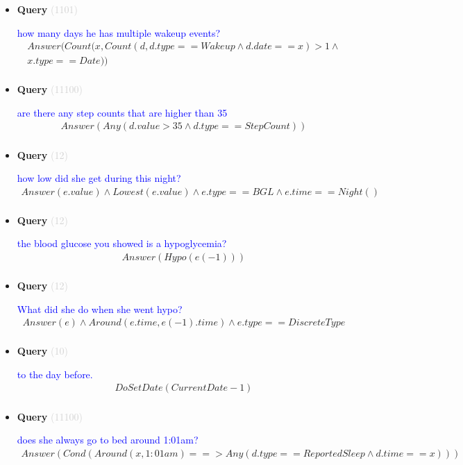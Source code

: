 \documentclass[11pt]{article}
\newcommand{\key}[1]{\textcolor{lightgray}{#1}}
\newcounter{CQuery}
\begin{document}
\begin{itemize}
\item
\textbf{Query\theCQuery} \key{(1101)} \addtocounter{CQuery}{1}
\textcolor{blue}{ how many days he has multiple wakeup events? }
\begin{multline*}
Answer(Count(x, Count(d, d.type==Wakeup \wedge d.date==x)>1 \wedge \\ 
x.type==Date)) \\ 
\end{multline*}


\item
\textbf{Query\theCQuery} \key{(11100)} \addtocounter{CQuery}{1}
\textcolor{blue}{ are there any step counts that are higher than 35 }
\begin{multline*}
Answer(Any(d.value>35 \wedge d.type==StepCount)) \\ 
\end{multline*}


\item
\textbf{Query\theCQuery} \key{(12)} \addtocounter{CQuery}{1}
\textcolor{blue}{ how low did she get during this night? }
\begin{multline*}
Answer(e.value) \wedge Lowest(e.value) \wedge e.type==BGL \wedge e.time==Night() \\ 
\end{multline*}


\item
\textbf{Query\theCQuery} \key{(12)} \addtocounter{CQuery}{1}
\textcolor{blue}{ the blood glucose you showed is a hypoglycemia? }
\begin{multline*}
Answer(Hypo(e(-1))) \\ 
\end{multline*}


\item
\textbf{Query\theCQuery} \key{(12)} \addtocounter{CQuery}{1}
\textcolor{blue}{ What did she do when she went hypo? }
\begin{multline*}
Answer(e) \wedge Around(e.time, e(-1).time) \wedge e.type==DiscreteType \\ 
\end{multline*}


\item
\textbf{Query\theCQuery} \key{(10)} \addtocounter{CQuery}{1}
\textcolor{blue}{ to the day before. }
\begin{multline*}
DoSetDate(CurrentDate - 1) \\ 
\end{multline*}


\item
\textbf{Query\theCQuery} \key{(11100)} \addtocounter{CQuery}{1}
\textcolor{blue}{ does she always go to bed around 1:01am? }
\begin{multline*}
Answer(Cond(Around(x, 1:01am) ==> Any(d.type==ReportedSleep \wedge d.time==x))) \\ 
\end{multline*}



\end{itemize}
\end{document}
